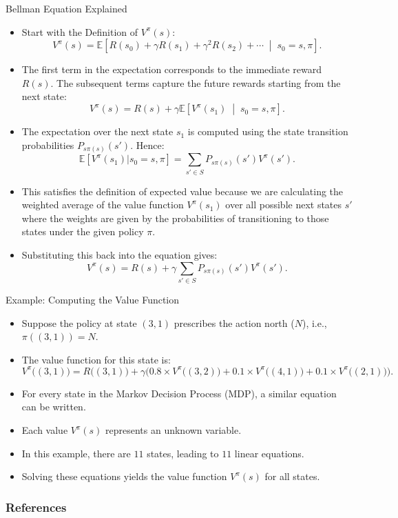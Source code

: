 \documentclass[handout]{beamer}
\begin{document}
\begin{frame}{Bellman Equation Explained}
\scriptsize
\begin{itemize}
\item Start with the Definition of \( V^\pi(s) \):
\[
V^{\pi}(s) = \mathbb{E}\left[ R(s_0) + \gamma R(s_1) + \gamma^2 R(s_2) + \cdots \;\middle|\; s_0 = s, \pi \right].
\]

    \item The first term in the expectation corresponds to the immediate reward \( R(s) \). The subsequent terms capture the future rewards starting from the next state:
\[
V^\pi(s) = R(s) + \gamma \mathbb{E}\left[V^\pi(s_1) \;\middle|\; s_0 = s, \pi\right].
\]

\item The expectation over the next state \( s_1 \) is computed using the state transition probabilities \( P_{s\pi(s)}(s') \). Hence:
\[
\mathbb{E}[V^\pi(s_1) | s_0 = s, \pi] = \sum_{s' \in S} P_{s\pi(s)}(s') V^\pi(s').
\]

\item This satisfies the definition of expected value because we are calculating the weighted average of the value function \( V^\pi(s_1) \) over all possible next states \( s' \) where the  weights are given by the probabilities of transitioning to those states under the given policy \( \pi \). 

\item Substituting this back into the equation gives:
\[
V^\pi(s) = R(s) + \gamma \sum_{s' \in S} P_{s\pi(s)}(s') V^\pi(s').
\]


\end{itemize}
\end{frame}


\begin{frame}{Example: Computing the Value Function}
\scriptsize
\begin{itemize}
\item Suppose the policy at state \( (3, 1) \) prescribes the action north (\( N \)), i.e., \( \pi((3, 1)) = N \).
\item The value function for this state is:
\[
V^\pi\big((3, 1)\big) = R\big((3, 1)\big) + \gamma \Big( 
    0.8 \times V^\pi\big((3, 2)\big) + 
    0.1 \times V^\pi\big((4, 1)\big) + 
    0.1 \times V^\pi\big((2, 1)\big) 
\Big).
\]

\item For every state in the Markov Decision Process (MDP), a similar equation can be written.
\item Each value \( V^\pi(s) \) represents an unknown variable.
\item In this example, there are \( 11 \) states, leading to \( 11 \) linear equations.
\item Solving these equations yields the value function \( V^\pi(s) \) for all states.

\end{itemize}
\end{frame}





\begin{frame}[allowframebreaks]\scriptsize
\frametitle{References}


%
\end{frame}  









\end{document}

